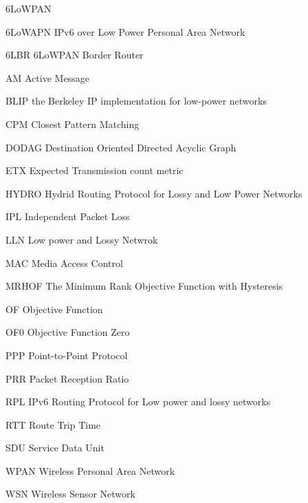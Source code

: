 \label{cha:abkuerzungen}

{\small
\begin{deflist}{6LoWPAN}
\raggedright
\item [6LoWAPN]      IPv6 over Low Power Personal Area Network
\item [6LBR]         6LoWPAN Border Router
\item [AM]           Active Message
\item [BLIP]         the Berkeley IP implementation for low-power networks
\item [CPM]          Closest Pattern Matching
\item [DODAG]        Destination Oriented Directed Acyclic Graph
\item [ETX]          Expected Transmission count metric 
\item [HYDRO]        Hydrid Routing Protocol for Lossy and Low Power Networks
\item [IPL]          Independent Packet Loss
\item [LLN]          Low power and Lossy Netwrok
\item [MAC]          Media Access Control
\item [MRHOF]        The Minimum Rank Objective Function with Hysteresis  
\item [OF]           Objective Function
\item [OF0]          Objective Function Zero
\item [PPP]          Point-to-Point Protocol
\item [PRR]          Packet Reception Ratio
\item [RPL]          IPv6 Routing Protocol for Low power and lossy networks
\item [RTT]          Route Trip Time
\item [SDU]          Service Data Unit
\item [WPAN]         Wireless Personal Area Network   
\item [WSN]          Wireless Sensor Network



      
\end{deflist}
}


